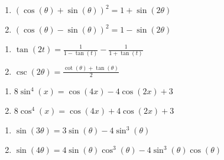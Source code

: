 \documentclass{ximera}
\begin{document}
\begin{multicols}{2}

\begin{enumerate}

\setcounter{enumi}{\value{HW}}

\item  $(\cos(\theta) + \sin(\theta))^2 = 1 + \sin(2\theta)$ \label{moreidentfirst}
\item  $(\cos(\theta) - \sin(\theta))^2 = 1 - \sin(2\theta)$

\setcounter{HW}{\value{enumi}}

\end{enumerate}

\end{multicols}

\begin{multicols}{2}

\begin{enumerate}

\setcounter{enumi}{\value{HW}}

\item  $\tan(2t) = \frac{1}{1-\tan(t)} - \frac{1}{1+\tan(t)}$
\item  $\csc(2\theta) = \frac{\cot(\theta) + \tan(\theta)}{2}$

\setcounter{HW}{\value{enumi}}

\end{enumerate}

\end{multicols}

\begin{multicols}{2}

\begin{enumerate}

\setcounter{enumi}{\value{HW}}

\item  $8 \sin^{4}(x) = \cos(4x) - 4\cos(2x)+3$
\item  $8 \cos^{4}(x) = \cos(4x) + 4\cos(2x)+3$

\setcounter{HW}{\value{enumi}}

\end{enumerate}

\end{multicols}

\begin{multicols}{2}

\begin{enumerate}

\setcounter{enumi}{\value{HW}}

\item \label{sine3theta} $\sin(3\theta) = 3\sin(\theta) - 4\sin^{3}(\theta)$
\item  $\sin(4\theta) = 4\sin(\theta)\cos^{3}(\theta) - 4\sin^{3}(\theta)\cos(\theta)$

\setcounter{HW}{\value{enumi}}

\end{enumerate}

\end{multicols}
\end{document}
